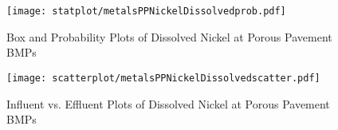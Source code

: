         \begin{figure}[hb]   %
            \centering
            \texttt{[image: statplot/metalsPPNickelDissolvedprob.pdf]}
            \caption{Box and Probability Plots of Dissolved Nickel at Porous Pavement BMPs}
        \end{figure}         %
        
        
        \begin{figure}[hb]   %
            \centering
            \texttt{[image: scatterplot/metalsPPNickelDissolvedscatter.pdf]}
            \caption{Influent vs. Effluent Plots of Dissolved Nickel at Porous Pavement BMPs}
        \end{figure}         %
        \clearpage
        